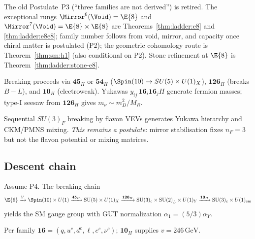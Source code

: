 \begin{remark}\label{rem:sm:P3status}
The old Postulate~P3 (``three families are not derived'') is retired.
The exceptional rungs $\Mirror^6(\Void)=\E{8}$ and
$\Mirror^7(\Void)=\E{8}\times\E{8}$ are Theorems~\ref{thm:ladder:e8} and
\ref{thm:ladder:e8e8}; family number follows from void, mirror, and capacity
once chiral matter is postulated (P2); the geometric cohomology route is
Theorem~\ref{thm:sm:h1} (also conditional on P2). Stone refinement at $\E{8}$ is
Theorem~\ref{thm:ladder:stone-e8}.
\end{remark}

\begin{postulate}\label{post:sm:P4}
Breaking proceeds via $\mathbf{45}_H$ or $\mathbf{54}_H$
($\Spin(10)\to SU(5)\times U(1)_X$), $\mathbf{126}_H$ (breaks $B-L$), and
$\mathbf{10}_H$ (electroweak). Yukawas $y_{ij}\,\mathbf{16}_i\mathbf{16}_j H$
generate fermion masses; type-I seesaw from $\mathbf{126}_H$ gives
$m_\nu\sim m_D^2/M_R$.
\end{postulate}

\begin{postulate}\label{post:sm:flavons}
Sequential $SU(3)_F$ breaking by flavon VEVs generates Yukawa hierarchy and
CKM/PMNS mixing. \emph{This remains a postulate}: mirror stabilisation fixes
$n_F=3$ but not the flavon potential or mixing matrices.
\end{postulate}

\subsection{Descent chain}
\label{sec:sm:descent}

\begin{theorem}\label{thm:sm:descent}
Assume P4. The breaking chain
\[
  \E{6}\xrightarrow{V}\Spin(10)\times U(1)
  \xrightarrow{\mathbf{45}_H}\mathrm{SU}(5)\times U(1)_X
  \xrightarrow{\mathbf{126}_H}\mathrm{SU}(3)_c\times\mathrm{SU(2)}_L\times U(1)_Y
  \xrightarrow{\mathbf{10}_H}\mathrm{SU}(3)_c\times U(1)_{\mathrm{em}}
\]
yields the SM gauge group with GUT normalization $\alpha_1=(5/3)\alpha_Y$.
\end{theorem}

Per family $\mathbf{16}=(q,u^c,d^c,\ell,e^c,\nu^c)$; $\mathbf{10}_H$ supplies
$v=246\,\mathrm{GeV}$.

